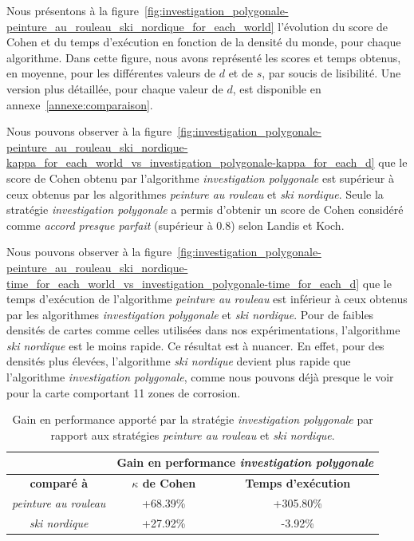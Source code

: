 \documentclass[francais,RandD]{rapportPFE}
\begin{document}
			Nous présentons à la figure~\ref{fig:investigation_polygonale-peinture_au_rouleau_ski_nordique_for_each_world} l'évolution du score de Cohen et du temps d'exécution en fonction de la densité du monde, pour chaque algorithme.
			Dans cette figure, nous avons représenté les scores et temps obtenus, en moyenne, pour les différentes valeurs de $d$ et de $s$, par soucis de lisibilité.
			Une version plus détaillée, pour chaque valeur de $d$, est disponible en annexe~\ref{annexe:comparaison}.

			Nous pouvons observer à la figure~\ref{fig:investigation_polygonale-peinture_au_rouleau_ski_nordique-kappa_for_each_world_vs_investigation_polygonale-kappa_for_each_d} que le score de Cohen obtenu par l'algorithme \textit{investigation polygonale} est supérieur à ceux obtenus par les algorithmes \textit{peinture au rouleau} et \textit{ski nordique}.
			Seule la stratégie \textit{investigation polygonale} a permis d'obtenir un score de Cohen considéré comme \textit{accord presque parfait} (supérieur à 0.8) selon Landis et Koch.

			Nous pouvons observer à la figure~\ref{fig:investigation_polygonale-peinture_au_rouleau_ski_nordique-time_for_each_world_vs_investigation_polygonale-time_for_each_d} que le temps d'exécution de l'algorithme \textit{peinture au rouleau} est inférieur à ceux obtenus par les algorithmes \textit{investigation polygonale} et \textit{ski nordique}.
			Pour de faibles densités de cartes comme celles utilisées dans nos expérimentations, l'algorithme \textit{ski nordique} est le moins rapide.
			Ce résultat est à nuancer.
			En effet, pour des densités plus élevées, l'algorithme \textit{ski nordique} devient plus rapide que l'algorithme \textit{investigation polygonale}, comme nous pouvons déjà presque le voir pour la carte comportant 11 zones de corrosion.

			\begin{table}[h!]
				\centering
				\begin{tabular}{|c|c|c|}
					\hline
					& \multicolumn{2}{c|}{\textbf{Gain en performance \textit{investigation polygonale}}} \\
					\hline
					\textbf{comparé à} & \textbf{$\kappa$ de Cohen} & \textbf{Temps d'exécution} \\
					\hline
					\textit{peinture au rouleau} & +68.39\% & +305.80\% \\
					\hline
					\textit{ski nordique} & +27.92\% & -3.92\% \\
					\hline
				\end{tabular}
				\caption{Gain en performance apporté par la stratégie \textit{investigation polygonale} par rapport aux stratégies \textit{peinture au rouleau} et \textit{ski nordique}.}
				\label{tab:gain}
			\end{table}
\end{document}
